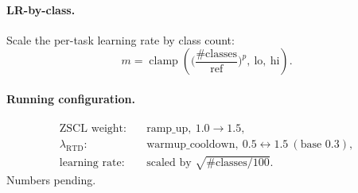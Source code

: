 \documentclass[11pt]{article}
\newcommand{\clamp}{\operatorname{clamp}}
\begin{document}
\paragraph{LR-by-class.} Scale the per-task learning rate by class count:
\[
m = \clamp\!\left(\Big(\frac{\#\text{classes}}{\text{ref}}\Big)^{p},\ \mathrm{lo},\ \mathrm{hi}\right).
\]

\paragraph{Running configuration.}
\begin{align}
\text{ZSCL weight:}\quad & \text{ramp\_up},\ 1.0 \to 1.5, \\
\lambda_{\text{RTD}}:\quad & \text{warmup\_cooldown},\ 0.5 \leftrightarrow 1.5 \ (\text{base } 0.3), \\
\text{learning rate:}\quad & \text{scaled by } \sqrt{\#\text{classes}/100}.
\end{align}
Numbers pending.
\end{document}
